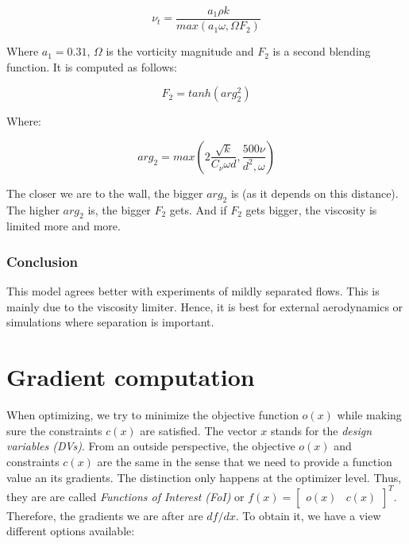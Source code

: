 \begin{equation}
    \nu_t = \frac{a_1 \rho k}{max(a_1 \omega, \Omega F_2)}
\end{equation}

\noindent Where $a_1 = 0.31$, $\Omega$ is the vorticity magnitude  and $F_2$ is
a second blending function. It is computed as follows:

\begin{equation}
    F_2 = tanh(arg_2^2)
\end{equation}

\noindent Where:

\begin{equation}
    arg_2 = max \left( 2\frac{\sqrt{k}}{C_{\nu} \omega d},
    \frac{500 \nu}{d^2, \omega}\right)
\end{equation}

\noindent The closer we are to the wall, the bigger $arg_2$ is (as it depends on
this distance). The higher $arg_2$ is, the bigger $F_2$ gets. And if $F_2$ gets
bigger, the viscosity is limited more and more.


\subsubsection{Conclusion}
This model agrees better with experiments of mildly separated flows. This
is mainly due to the viscosity limiter. Hence, it is best for external
aerodynamics or simulations where separation is important. \cite{cfd101_sst}








\section{Gradient computation}
\label{sec:gradient_computation}
When optimizing, we try to minimize the objective function $o(x)$ while making
sure the constraints $c(x)$ are satisfied. The vector $x$ stands for the
\textit{design variables (DVs)}. From an outside perspective, the objective
$o(x)$ and constraints $c(x)$ are the same in the sense that we need to provide
a function value an its gradients. The distinction only happens at the
optimizer level. Thus, they are are called \textit{Functions of Interest (FoI)}
or $f(x) = \begin{bmatrix} o(x) & c(x)\end{bmatrix}^T$. Therefore, the
gradients we are after are $d f / d x$. To obtain it, we have a view different
options available: \cite{mdobook}


